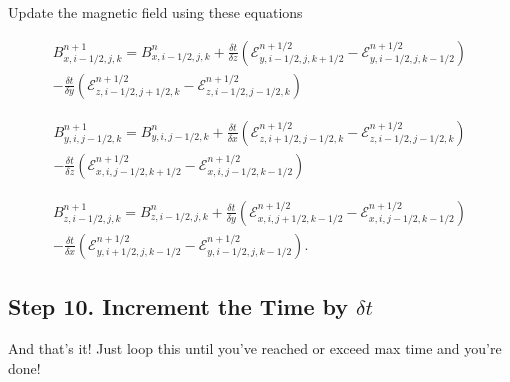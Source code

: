Update the magnetic field using these equations

$$
    \begin{aligned}
        B^{n+1}_{x,i-1/2,j,k} = B^{n}_{x,i-1/2,j,k}
        + \frac{\delta t}{\delta z} \left( \mathcal{E}^{n+1/2}_{y,i-1/2,j,k+1/2} - \mathcal{E}^{n+1/2}_{y,i-1/2,j,k-1/2} \right) \\
        - \frac{\delta t}{\delta y} \left( \mathcal{E}^{n+1/2}_{z,i-1/2,j+1/2,k} - \mathcal{E}^{n+1/2}_{z,i-1/2,j-1/2,k} \right)
    \end{aligned}
$$

$$
    \begin{aligned}
        B^{n+1}_{y,i,j-1/2,k} = B^{n}_{y,i,j-1/2,k}
        + \frac{\delta t}{\delta x} \left( \mathcal{E}^{n+1/2}_{z,i+1/2,j-1/2,k} - \mathcal{E}^{n+1/2}_{z,i-1/2,j-1/2,k} \right) \\
        - \frac{\delta t}{\delta z} \left( \mathcal{E}^{n+1/2}_{x,i,j-1/2,k+1/2} - \mathcal{E}^{n+1/2}_{x,i,j-1/2,k-1/2} \right)
    \end{aligned}
$$

$$
    \begin{aligned}
        B^{n+1}_{z,i-1/2,j,k} = B^{n}_{z,i-1/2,j,k}
        + \frac{\delta t}{\delta y} \left( \mathcal{E}^{n+1/2}_{x,i,j+1/2,k-1/2} - \mathcal{E}^{n+1/2}_{x,i,j-1/2,k-1/2} \right) \\
        - \frac{\delta t}{\delta x} \left( \mathcal{E}^{n+1/2}_{y,i+1/2,j,k-1/2} - \mathcal{E}^{n+1/2}_{y,i-1/2,j,k-1/2} \right).
    \end{aligned}
$$

\subsection{Step 10. Increment the Time by \texorpdfstring{$\delta t$}{dt}}
\label{vlct:increment-time}

And that's it! Just loop this until you've reached or exceed max time and you're done!
